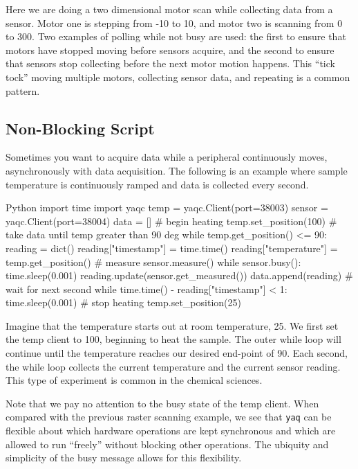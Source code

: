 \documentclass[11pt, full]{article}
\newcommand\yaq{\texttt{yaq}}
\begin{document}
Here we are doing a two dimensional motor scan while collecting data from a sensor.
Motor one is stepping from -10 to 10, and motor two is scanning from 0 to 300.
Two examples of polling while not busy are used: the first to ensure that motors have stopped moving before sensors acquire, and the second to ensure that sensors stop collecting before the next motor motion happens.
This ``tick tock'' moving multiple motors, collecting sensor data, and repeating is a common pattern.

\clearpage

\subsection{Non-Blocking Script}

Sometimes you want to acquire data while a peripheral continuously moves, asynchronously with data acquisition.
The following is an example where sample temperature is continuously ramped and data is collected every second.

\begin{codefragment}{Python}
import time
import yaqc
temp = yaqc.Client(port=38003)
sensor = yaqc.Client(port=38004)
data = []
# begin heating
temp.set_position(100)
# take data until temp greater than 90 deg
while temp.get_position() <= 90:
    reading = dict()
    reading["timestamp"] = time.time()
    reading["temperature"] = temp.get_position()
    # measure
    sensor.measure()
    while sensor.busy():
        time.sleep(0.001)
    reading.update(sensor.get_measured())
    data.append(reading)
    # wait for next second
    while time.time() - reading["timestamp"] < 1:
        time.sleep(0.001)
# stop heating
temp.set_position(25)
\end{codefragment}

Imagine that the temperature starts out at room temperature, 25.
We first set the temp client to 100, beginning to heat the sample.
The outer while loop will continue until the temperature reaches our desired end-point of 90.
Each second, the while loop collects the current temperature and the current sensor reading.
This type of experiment is common in the chemical sciences.

Note that we pay no attention to the busy state of the temp client.
When compared with the previous raster scanning example, we see that \yaq{} can be flexible about which hardware operations are kept synchronous and which are allowed to run ``freely'' without blocking other operations.
The ubiquity and simplicity of the busy message allows for this flexibility.
\end{document}
